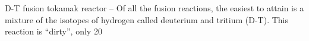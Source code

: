 \documentclass[a4paper]{book}
\begin{document}
D-T fusion tokamak reactor – Of all the fusion reactions, the easiest to attain is a mixture of the isotopes of hydrogen called deuterium and tritium (D-T). This reaction is “dirty”, only 20%
 
\end{document}
